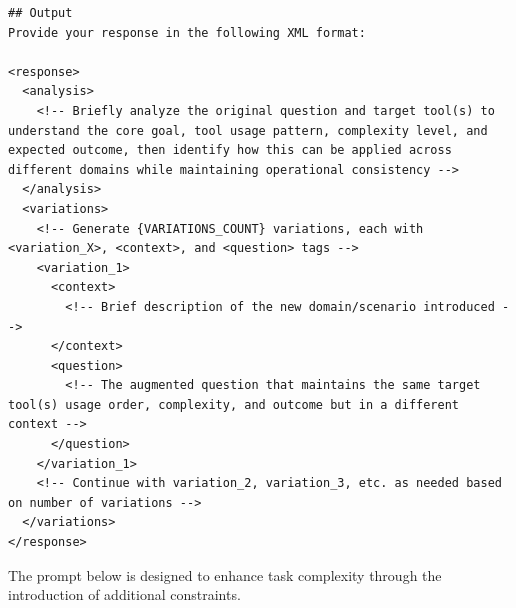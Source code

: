 \begin{verbatim}
## Output
Provide your response in the following XML format:

<response>
  <analysis>
    <!-- Briefly analyze the original question and target tool(s) to understand the core goal, tool usage pattern, complexity level, and expected outcome, then identify how this can be applied across different domains while maintaining operational consistency -->
  </analysis>
  <variations>
    <!-- Generate {VARIATIONS_COUNT} variations, each with <variation_X>, <context>, and <question> tags -->
    <variation_1>
      <context>
        <!-- Brief description of the new domain/scenario introduced -->
      </context>
      <question>
        <!-- The augmented question that maintains the same target tool(s) usage order, complexity, and outcome but in a different context -->
      </question>
    </variation_1>
    <!-- Continue with variation_2, variation_3, etc. as needed based on number of variations -->
  </variations>
</response>
\end{verbatim}

The prompt below is designed to enhance task complexity through the introduction of additional constraints.

